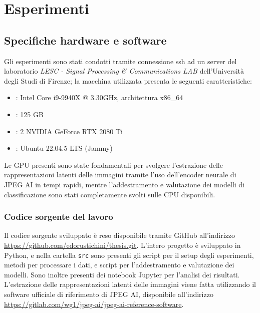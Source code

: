 \chapter{Esperimenti}\label{ch:exp}
\section{Specifiche hardware e software}
Gli esperimenti sono stati condotti tramite connessione ssh ad un server del laboratorio \textit{LESC - Signal Processing \& Communications LAB} dell'Università degli Studi di Firenze; la macchina utilizzata presenta le seguenti caratteristiche:
\begin{itemize}
    \item {}: Intel Core i9-9940X @ 3.30GHz, architettura x86\_64
    \item {}: 125 GB
    \item {}: 2 NVIDIA GeForce RTX 2080 Ti
    \item {}: Ubuntu 22.04.5 LTS (Jammy)
\end{itemize}
Le GPU presenti sono state fondamentali per svolgere l'estrazione delle rappresentazioni latenti delle immagini tramite l'uso dell'encoder neurale di JPEG AI in tempi rapidi, mentre l'addestramento e valutazione dei modelli di classificazione sono stati completamente svolti sulle CPU disponibili.
\subsection{Codice sorgente del lavoro}
Il codice sorgente sviluppato è reso disponibile tramite GitHub all'indirizzo \url{https://github.com/edorustichini/thesis.git}. L'intero progetto è sviluppato in Python, e nella cartella \texttt{src} sono presenti gli script per il setup degli esperimenti, metodi per processare i dati, e script per l'addestramento e valutazione dei modelli. Sono inoltre presenti dei notebook Jupyter per l'analisi dei risultati.\\
L'estrazione delle rappresentazioni latenti delle immagini viene fatta utilizzando il software  ufficiale di riferimento di JPEG AI, disponibile all'indirizzo \url{https://gitlab.com/wg1/jpeg-ai/jpeg-ai-reference-software}.
